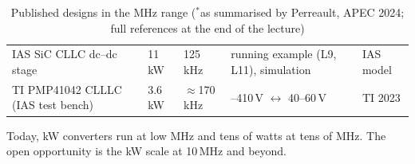 \begin{frame}
\begin{table}
\begin{tabular}{|>{\raggedright\arraybackslash}p{3.75cm}|l|l|>{\raggedright\arraybackslash}p{4.3cm}|l|}
			IAS SiC CLLC dc--dc stage                   & 11\,kW         & 125\,kHz                 & running example (L9, L11), simulation   & IAS model                      \\
			TI PMP41042 CLLLC (IAS test bench)          & 3.6\,kW        & $\approx$170\,kHz        & 380--410\,V $\leftrightarrow$ 40--60\,V & TI 2023                        \\
			\hline
		\end{tabular}
		\caption{Published designs in the MHz range ($^{*}$as summarised by Perreault, APEC 2024; full references at the end of the lecture)}
	\end{table}
	Today, kW converters run at low MHz and tens of watts at tens of MHz. The open opportunity is the kW scale at 10\,MHz and beyond.
\end{frame}

